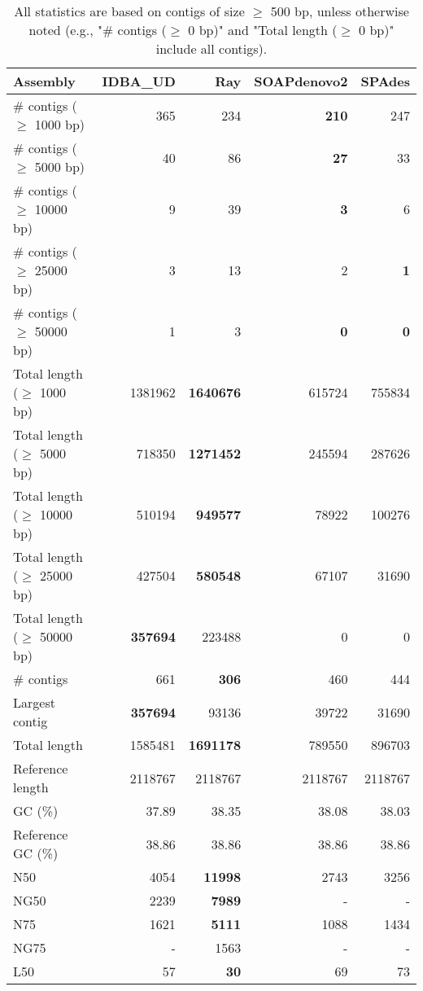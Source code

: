 \documentclass[12pt,a4paper]{article}
\begin{document}
\begin{table}[ht]
\begin{center}
\caption{All statistics are based on contigs of size $\geq$ 500 bp, unless otherwise noted (e.g., "\# contigs ($\geq$ 0 bp)" and "Total length ($\geq$ 0 bp)" include all contigs).}
\begin{tabular}{|l*{4}{|r}|}
\hline
Assembly & IDBA\_UD & Ray & SOAPdenovo2 & SPAdes \\ \hline
\# contigs ($\geq$ 1000 bp) & 365 & 234 & {\bf 210} & 247 \\ \hline
\# contigs ($\geq$ 5000 bp) & 40 & 86 & {\bf 27} & 33 \\ \hline
\# contigs ($\geq$ 10000 bp) & 9 & 39 & {\bf 3} & 6 \\ \hline
\# contigs ($\geq$ 25000 bp) & 3 & 13 & 2 & {\bf 1} \\ \hline
\# contigs ($\geq$ 50000 bp) & 1 & 3 & {\bf 0} & {\bf 0} \\ \hline
Total length ($\geq$ 1000 bp) & 1381962 & {\bf 1640676} & 615724 & 755834 \\ \hline
Total length ($\geq$ 5000 bp) & 718350 & {\bf 1271452} & 245594 & 287626 \\ \hline
Total length ($\geq$ 10000 bp) & 510194 & {\bf 949577} & 78922 & 100276 \\ \hline
Total length ($\geq$ 25000 bp) & 427504 & {\bf 580548} & 67107 & 31690 \\ \hline
Total length ($\geq$ 50000 bp) & {\bf 357694} & 223488 & 0 & 0 \\ \hline
\# contigs & 661 & {\bf 306} & 460 & 444 \\ \hline
Largest contig & {\bf 357694} & 93136 & 39722 & 31690 \\ \hline
Total length & 1585481 & {\bf 1691178} & 789550 & 896703 \\ \hline
Reference length & 2118767 & 2118767 & 2118767 & 2118767 \\ \hline
GC (\%) & 37.89 & 38.35 & 38.08 & 38.03 \\ \hline
Reference GC (\%) & 38.86 & 38.86 & 38.86 & 38.86 \\ \hline
N50 & 4054 & {\bf 11998} & 2743 & 3256 \\ \hline
NG50 & 2239 & {\bf 7989} & - & - \\ \hline
N75 & 1621 & {\bf 5111} & 1088 & 1434 \\ \hline
NG75 & - & 1563 & - & - \\ \hline
L50 & 57 & {\bf 30} & 69 & 73 \\ \hline

\end{tabular}
\end{center}
\end{table}
\end{document}
